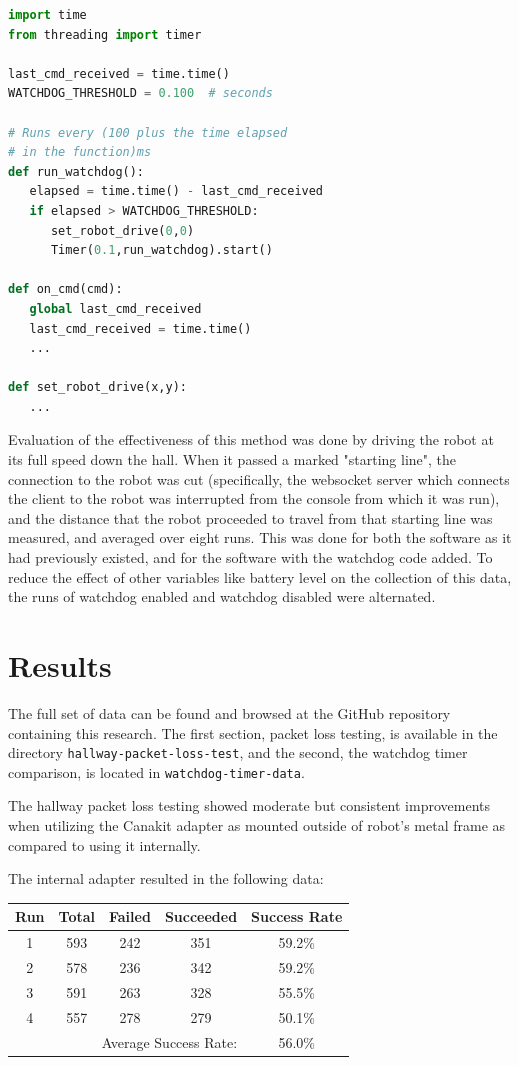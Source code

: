 \documentclass{IEEEtran}
\begin{document}
\begin{lstlisting}[language=Python,basicstyle=\ttfamily]
import time
from threading import timer

last_cmd_received = time.time()
WATCHDOG_THRESHOLD = 0.100  # seconds

# Runs every (100 plus the time elapsed
# in the function)ms
def run_watchdog():
   elapsed = time.time() - last_cmd_received
   if elapsed > WATCHDOG_THRESHOLD:
      set_robot_drive(0,0)
      Timer(0.1,run_watchdog).start() 

def on_cmd(cmd):
   global last_cmd_received
   last_cmd_received = time.time()
   ...

def set_robot_drive(x,y):
   ...
\end{lstlisting}


Evaluation of the effectiveness of this method was done by driving the robot
at its full speed down the hall. When it passed a marked "starting line",
the connection to the robot was cut (specifically, the websocket server which
connects the client to the robot was interrupted from the console from which
it was run), and the distance that the robot proceeded to travel from that
starting line was measured, and averaged over eight runs.
This was done for both the software as it had
previously existed, and for the software with the watchdog code added. To
reduce the effect of other variables like battery level on the collection of
this data, the runs of watchdog enabled and watchdog disabled were alternated.

\section{Results}
The full set of data can be found and browsed at the GitHub repository
containing this research\cite{uropgithub}. The first section, packet loss
testing, is available in the directory \texttt{hallway-packet-loss-test},
and the second, the watchdog timer comparison, is located in
\texttt{watchdog-timer-data}.

The hallway packet loss testing showed moderate but consistent improvements
when utilizing the Canakit adapter as mounted outside of robot's metal frame
as compared to using it internally.

The internal adapter resulted in the following data:

\begin{tabular}{ c | c | c | c | c }
  Run & Total & Failed & Succeeded & Success Rate \\ \hline
  1 & 593 & 242 & 351 & 59.2\% \\
  2 & 578 & 236 & 342 & 59.2\% \\
  3 & 591 & 263 & 328 & 55.5\% \\
  4 & 557 & 278 & 279 & 50.1\% \\
  \hline
  \multicolumn{4}{r}{Average Success Rate:} & 56.0\%
\end{tabular}
\end{document}
